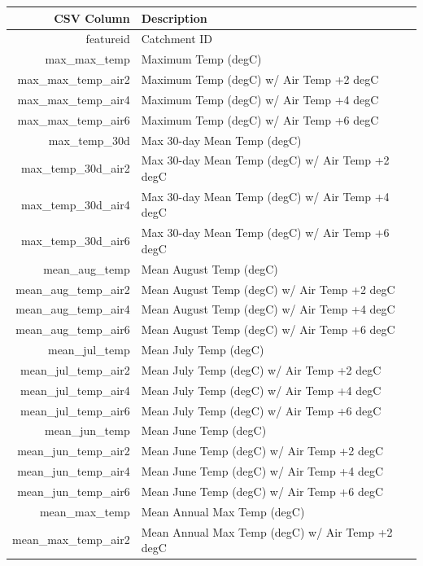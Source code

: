 \documentclass[]{book}
\begin{document}
\begin{tabular}{r|l}
\hline
CSV Column & Description\\
\hline
featureid & Catchment ID\\
\hline
max\_max\_temp & Maximum Temp (degC)\\
\hline
max\_max\_temp\_air2 & Maximum Temp (degC) w/ Air Temp +2 degC\\
\hline
max\_max\_temp\_air4 & Maximum Temp (degC) w/ Air Temp +4 degC\\
\hline
max\_max\_temp\_air6 & Maximum Temp (degC) w/ Air Temp +6 degC\\
\hline
max\_temp\_30d & Max 30-day Mean Temp (degC)\\
\hline
max\_temp\_30d\_air2 & Max 30-day Mean Temp (degC) w/ Air Temp +2 degC\\
\hline
max\_temp\_30d\_air4 & Max 30-day Mean Temp (degC) w/ Air Temp +4 degC\\
\hline
max\_temp\_30d\_air6 & Max 30-day Mean Temp (degC) w/ Air Temp +6 degC\\
\hline
mean\_aug\_temp & Mean August Temp (degC)\\
\hline
mean\_aug\_temp\_air2 & Mean August Temp (degC) w/ Air Temp +2 degC\\
\hline
mean\_aug\_temp\_air4 & Mean August Temp (degC) w/ Air Temp +4 degC\\
\hline
mean\_aug\_temp\_air6 & Mean August Temp (degC) w/ Air Temp +6 degC\\
\hline
mean\_jul\_temp & Mean July Temp (degC)\\
\hline
mean\_jul\_temp\_air2 & Mean July Temp (degC) w/ Air Temp +2 degC\\
\hline
mean\_jul\_temp\_air4 & Mean July Temp (degC) w/ Air Temp +4 degC\\
\hline
mean\_jul\_temp\_air6 & Mean July Temp (degC) w/ Air Temp +6 degC\\
\hline
mean\_jun\_temp & Mean June Temp (degC)\\
\hline
mean\_jun\_temp\_air2 & Mean June Temp (degC) w/ Air Temp +2 degC\\
\hline
mean\_jun\_temp\_air4 & Mean June Temp (degC) w/ Air Temp +4 degC\\
\hline
mean\_jun\_temp\_air6 & Mean June Temp (degC) w/ Air Temp +6 degC\\
\hline
mean\_max\_temp & Mean Annual Max Temp (degC)\\
\hline
mean\_max\_temp\_air2 & Mean Annual Max Temp (degC) w/ Air Temp +2 degC\\

\end{tabular}
\end{document}
